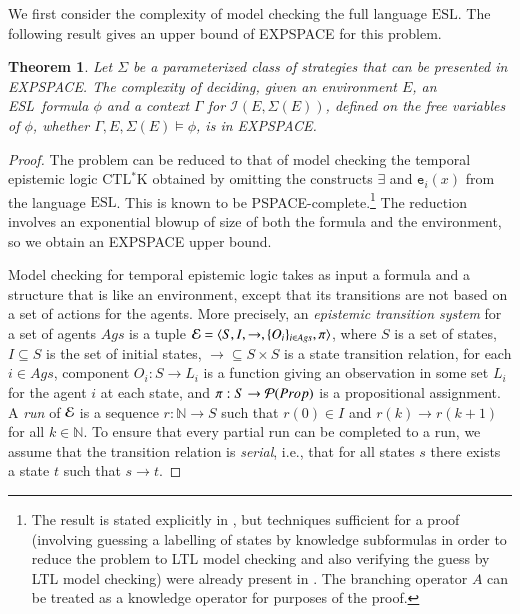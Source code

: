 \documentclass[a4wide]{article}
\newcommand{\CTLsK}{\mbox{CTL$^*$K}}
\newcommand{\ESL}{\mbox{ESL}}
\newcommand{\trans}{\rightarrow}
\newcommand{\Prop}{Prop}
\newcommand{\nat}{\mathbb{N}}
\newcommand{\powerset}[1]{{\cal P}(#1) }
\newcommand{\ets}{{\cal E}}
\newtheorem{theorem}{Theorem}
\theoremstyle{examplesty}
\newcommand{\Ags}{\mathit{Ags}}
\newcommand{\I}{\mathcal{I}}
\newcommand{\lid}[2]{\mathtt{e}_{#1}(#2)}
\newcommand{\Env}{E}
\newcommand{\Strat}{\Sigma}
\newcommand{\Strats}{\Sigma}
\newcommand{\Cont}{\Gamma}
\begin{document}
We first consider the complexity of model checking the full language $\ESL$.
The following result gives an upper bound of EXPSPACE for this problem. 


\begin{theorem}\label{mcESLupper}
Let $\Strats$  be a parameterized   class of strategies 
that can be presented in  EXPSPACE.
The complexity of deciding, given an environment $\Env$, an \ESL\ formula $\phi$ 
and a context $\Cont$ for 
$\I(E, \Strats(E))$, defined on the free variables of $\phi$,  
whether $\Cont, \Env,\Strat(\Env)\models \phi$, is in EXPSPACE. 
\end{theorem}

\begin{proof} 
The problem can be reduced to that of model checking the temporal epistemic logic $\CTLsK$ 
obtained by omitting the constructs $\exists$ and $\lid{i}{x}$ from the language $\ESL$. 
This is known to be PSPACE-complete.\footnote{The result is stated explicitly in \cite{EGM2007:LFCS}, but techniques sufficient for a 
proof (involving guessing a labelling of states by knowledge  subformulas in order
to reduce the problem to LTL model checking and also verifying the guess
by LTL model checking) were already present in \cite{Vardi96tark-kbp}.
The branching operator $A$ can be treated as a knowledge operator for purposes of the proof.} 
The reduction 
involves 
an exponential blowup of size of both the formula and the environment, 
so we obtain an EXPSPACE upper bound. 

Model checking for temporal epistemic logic takes as input a formula and a
structure that is like an environment, except that its transitions are not based on 
a set of actions for the agents. More precisely, 
an \emph{epistemic transition system} for a set of agents $\Ags$ 
is a tuple $\ets = \langle S,I, \trans, \{O_i\}_{i \in \Ags}, \pi\rangle$, 
where $S$ is a set of states, $I\subseteq S$ is the set of initial states, 
$\trans \subseteq S\times S$ is a state transition relation, for 
each $i \in \Ags$, component $O_i:S\rightarrow L_i$ is a 
function giving an observation in some set $L_i$ for the agent $i$ at each state, 
and $\pi: S\rightarrow \powerset{\Prop}$ is a propositional assignment. 
A {\em run} of $\ets$ is a sequence $r: \nat \rightarrow S$
such that $r(0) \in I$ and $r(k) \trans r(k+1)$ for all $k \in \nat$. 
To ensure that every partial run can be completed to a run, we assume that 
the transition relation is {\em serial}, i.e., that for all states $s$ there exists a 
state $t$ such that $s\trans t$.



\end{proof}
\end{document}
